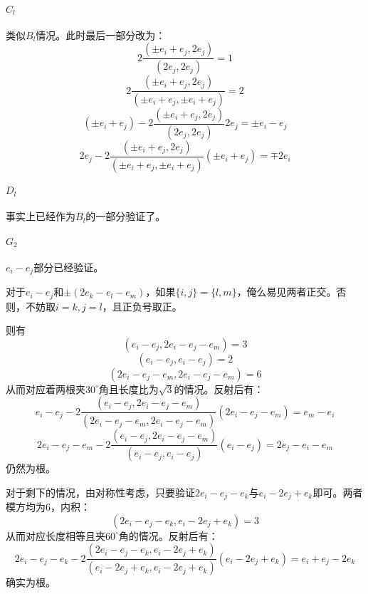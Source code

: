 \documentclass{ctexart}
\begin{document}
	\paragraph{$C_l$} 类似$B_l$情况。此时最后一部分改为：
	\begin{equation}
	2\frac{(\pm e_i+e_j,2e_j)}{(2e_j,2e_j)}=1
	\end{equation}
	\begin{equation}
	2\frac{(\pm e_i+e_j,2e_j)}{(\pm e_i+e_j,\pm e_i+e_j)}=2
	\end{equation}
	\begin{equation}
	(\pm e_i+e_j)-2\frac{(\pm e_i+e_j,2e_j)}{(2e_j,2e_j)}2e_j=\pm e_i-e_j
	\end{equation}
	\begin{equation}
	2e_j-2\frac{(\pm e_i+e_j,2e_j)}{(\pm e_i+e_j,\pm e_i+e_j)}(\pm e_i+e_j)=\mp 2e_i
	\end{equation}
	
	\paragraph{$D_l$} 事实上已经作为$B_l$的一部分验证了。
	
	\paragraph{$G_2$} $e_i-e_j$部分已经验证。
	
	对于$e_i-e_j$和$\pm(2e_k-e_l-e_m)$，如果$\{i,j\}=\{l,m\}$，俺么易见两者正交。否则，不妨取$i=k,j=l$，且正负号取正。
	
	则有
	\begin{equation}
	(e_i-e_j,2e_i-e_j-e_m)=3
	\end{equation}
	\begin{equation}
	(e_i-e_j,e_i-e_j)=2
	\end{equation}
	\begin{equation}
	(2e_i-e_j-e_m,2e_i-e_j-e_m)=6
	\end{equation}
	从而对应着两根夹$30^\circ$角且长度比为$\sqrt 3$的情况。反射后有：
	\begin{equation}
	e_i-e_j-2\frac{(e_i-e_j,2e_i-e_j-e_m)}{(2e_i-e_j-e_m,2e_i-e_j-e_m)}(2e_i-e_j-e_m)=e_m-e_i
	\end{equation}
	\begin{equation}
	2e_i-e_j-e_m-2\frac{(e_i-e_j,2e_i-e_j-e_m)}{(e_i-e_j,e_i-e_j)}(e_i-e_j)=2e_j-e_i-e_m
	\end{equation}
	仍然为根。
	
	对于剩下的情况，由对称性考虑，只要验证$2e_i-e_j-e_k$与$e_i-2e_j+e_k$即可。两者模方均为$6$，内积：
	\begin{equation}
	(2e_i-e_j-e_k,e_i-2e_j+e_k)=3
	\end{equation}
	从而对应长度相等且夹$60^\circ$角的情况。反射后有：
	\begin{equation}
	2e_i-e_j-e_k-2\frac{(2e_i-e_j-e_k,e_i-2e_j+e_k)}{(e_i-2e_j+e_k,e_i-2e_j+e_k)}(e_i-2e_j+e_k)=e_i+e_j-2e_k
	\end{equation}
	确实为根。
	
\end{document}

